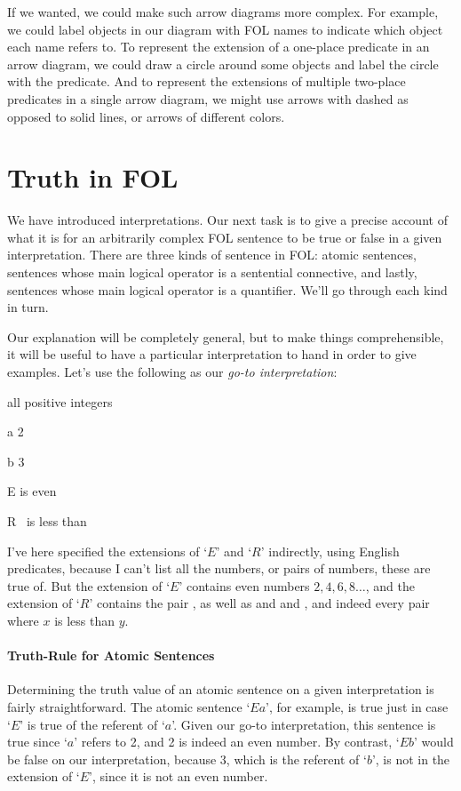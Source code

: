 If we wanted, we could make such arrow diagrams more complex. For example, we could label objects in our diagram with FOL names to indicate which object each name refers to.  To represent the extension of a one-place predicate in an arrow diagram, we could draw a circle around some objects and label the circle with the predicate. And to represent the extensions of multiple two-place predicates in a single arrow diagram, we might use arrows with dashed as opposed to solid lines, or arrows of different colors.



\section{Truth in FOL}\label{s:TruthFOL}

We have introduced interpretations. Our next task is to give a precise account of what it is for an arbitrarily complex FOL sentence to be true or false in a given interpretation. There are three kinds of sentence in FOL: atomic sentences, sentences whose main logical operator is a sentential connective, and lastly, sentences whose main logical operator is a quantifier.  We'll go through each kind in turn.

Our explanation will be completely general, but to make things comprehensible, it will be useful to have a particular interpretation to hand in order to give examples.  Let's use the following as our \emph{go-to interpretation}:
\begin{ekey}
		\item[\text{Domain}] all positive integers
		\item[a] 2
		\item[b] 3
		\item[E] \blank is even
		\item[R] \blank \ is less than \blank
	\end{ekey}
I've here specified the extensions of `$E$' and `$R$' indirectly, using English predicates, because I can't list all the numbers, or pairs of numbers, these are true of.  But the extension of `$E$' contains even numbers $2, 4, 6, 8 \ldots$, and the extension of `$R$' contains the pair , as well as  and  and , and indeed every pair  where $x$ is less than $y$.

\paragraph{Truth-Rule for Atomic Sentences} Determining the truth value of an atomic sentence on a given interpretation is fairly straightforward.  The atomic sentence `$Ea$', for example, is true just in case `$E$' is true of the referent of `$a$'.  Given our go-to interpretation, this sentence is true since `$a$' refers to 2, and 2 is indeed an even number.  By contrast, `$Eb$' would be false on our interpretation, because 3, which is the referent of `$b$', is not in the extension of `$E$', since it is not an even number.


